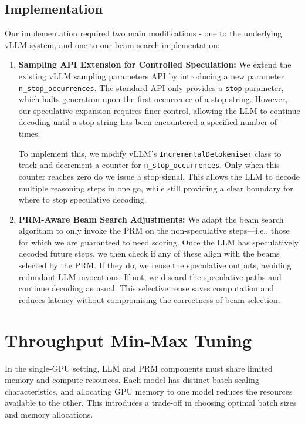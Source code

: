 \documentclass[11pt,twoside]{report}
\begin{document}
\subsection{Implementation}
Our implementation required two main modifications - one to the underlying vLLM system, and one to our beam search implementation:

\begin{enumerate}
  \item \textbf{Sampling API Extension for Controlled Speculation:} We extend the existing vLLM sampling parameters API by introducing a new parameter \texttt{n\_stop\_occurrences}. 
    The standard API only provides a \texttt{stop} parameter, which halts generation upon the first occurrence of a stop string. 
    However, our speculative expansion requires finer control, allowing the LLM to continue decoding until a stop string has been encountered a specified number of times.

  To implement this, we modify vLLM’s \texttt{IncrementalDetokeniser} class to track and decrement a counter for \texttt{n\_stop\_occurrences}. Only when this counter reaches zero do we issue a stop signal. This allows the LLM to decode multiple reasoning steps in one go, while still providing a clear boundary for where to stop speculative decoding.

  \item \textbf{PRM-Aware Beam Search Adjustments:} We adapt the beam search algorithm to only invoke the PRM on the non-speculative steps—i.e., those for which we are guaranteed to need scoring. 
    Once the LLM has speculatively decoded future steps, we then check if any of these align with the beams selected by the PRM. 
    If they do, we reuse the speculative outputs, avoiding redundant LLM invocations. 
    If not, we discard the speculative paths and continue decoding as usual. This selective reuse saves computation and reduces latency without compromising the correctness of beam selection.
\end{enumerate}

\section{Throughput Min-Max Tuning}

In the single-GPU setting, LLM and PRM components must share limited memory and compute resources. 
Each model has distinct batch scaling characteristics, and allocating GPU memory to one model reduces the resources available to the other. 
This introduces a trade-off in choosing optimal batch sizes and memory allocations. 
\end{document}
